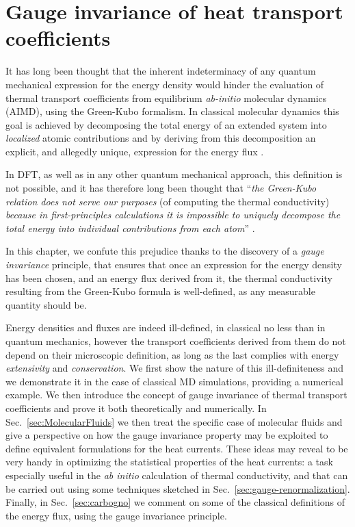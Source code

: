 \chapter{Gauge invariance of heat transport coefficients} \label{ch:gauge-invariance}

\begin{LEtext}
It has long been thought that the inherent indeterminacy of any quantum mechanical expression for the energy density would hinder the evaluation of thermal transport coefficients from equilibrium \emph{ab-initio} molecular dynamics (AIMD), using the Green-Kubo formalism.  
In classical molecular dynamics this goal is achieved by decomposing the total energy of an extended system into \emph{localized} atomic contributions and by deriving from this decomposition an explicit, and allegedly unique, expression for the energy flux \cite{Irving1950}.

In DFT, as well as in any other quantum mechanical approach, this definition is not possible, and it has therefore long been thought that ``\emph{the Green-Kubo relation does not serve our purposes} (of computing the thermal conductivity) \emph{because in first-principles calculations it is impossible to uniquely decompose the total energy into individual contributions from each atom}'' \cite{Stackhouse2010b}. 

In this chapter, we confute this prejudice thanks to the discovery of a \emph{gauge invariance} principle, that ensures that once an expression for the energy density has been chosen, and an energy flux derived from it, the thermal conductivity resulting from the Green-Kubo formula is well-defined, as any measurable quantity should be. 

Energy densities and fluxes are indeed ill-defined, in classical no less than in quantum mechanics, however the transport coefficients derived from them do not depend on their microscopic definition, as long as the last complies with energy \emph{extensivity} and \emph{conservation}. 
We first show the nature of this ill-definiteness and we demonstrate it in the case of classical MD simulations, providing a numerical example. We then introduce the concept of gauge invariance of thermal transport coefficients and prove it both theoretically and numerically.
In Sec.~\ref{sec:MolecularFluids} we then treat the specific case of molecular fluids and give a perspective on how the gauge invariance property may be exploited to define equivalent formulations for the heat currents. These ideas may reveal to be very handy in optimizing the statistical properties of the heat currents: a task especially useful in the \emph{ab initio} calculation of thermal conductivity, and that can be carried out using some techniques sketched in Sec.~\ref{sec:gauge-renormalization}.
Finally, in Sec.~\ref{sec:carbogno} we comment on some of the classical definitions of the energy flux, using the gauge invariance principle.
\end{LEtext}


